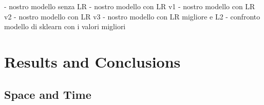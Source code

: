 \documentclass[
	letterpaper, %
	10pt, %
]{class}
\begin{document}
- nostro modello senza LR
- nostro modello con LR v1
- nostro modello con LR v2
- nostro modello con LR v3
- nostro modello con LR migliore e L2
- confronto modello di sklearn con i valori migliori



\section{Results and Conclusions}

\subsection{Space and Time}



\printbibliography %

\end{document}
